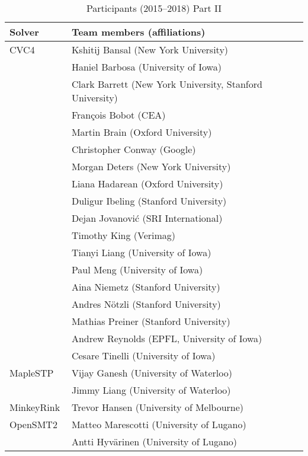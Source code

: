 {  \begin{table}
    \centering
    \caption{Participants (2015--2018) Part II}
    \label{table:participants2}
    \begin{tabular}{ll}
      \toprule
      Solver & Team members (affiliations)\\
      \midrule \midrule
      CVC4~\cite{DBLP:conf/cav/BarrettCDHJKRT11}
      & Kshitij Bansal (New York University) \\
      & Haniel Barbosa (University of Iowa) \\
      & Clark Barrett (New York University, Stanford University) \\
      & Fran\c{c}ois Bobot (CEA) \\
      & Martin Brain (Oxford University) \\
      & Christopher Conway (Google) \\
      & Morgan Deters (New York University) \\
      & Liana Hadarean (Oxford University) \\
      & Duligur Ibeling (Stanford University) \\
      & Dejan Jovanovi\'c (SRI International) \\
      & Timothy King (Verimag) \\
      & Tianyi Liang (University of Iowa) \\
      & Paul Meng (University of Iowa) \\
      & Aina Niemetz (Stanford University) \\
      & Andres N\"otzli (Stanford University) \\
      & Mathias Preiner (Stanford University) \\
      & Andrew Reynolds (EPFL, University of Iowa) \\
      & Cesare Tinelli (University of Iowa)
      \\ \midrule

      MapleSTP
      & Vijay Ganesh (University of Waterloo) \\
      & Jimmy Liang (University of Waterloo)
      \\ \midrule

      MinkeyRink
      & Trevor Hansen (University of Melbourne)
      \\ \midrule

      OpenSMT2~\cite{DBLP:conf/sat/HyvarinenMAS16}
      & Matteo Marescotti (University of Lugano) \\
      & Antti Hyv\"arinen (University of Lugano)
      \\ \midrule


\end{tabular}
\end{table}}
